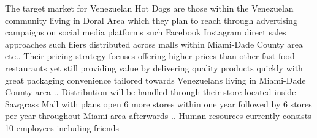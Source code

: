 The target market for Venezuelan Hot Dogs are those within the Venezuelan community living in Doral Area which they plan to reach through advertising campaigns on social media platforms such Facebook Instagram direct sales approaches such fliers distributed across malls within Miami-Dade County area etc.. Their pricing strategy focuses offering higher prices than other fast food restaurants yet still providing value by delivering quality products quickly with great packaging convenience tailored towards Venezuelans living in Miami-Dade County area .. Distribution will be handled through their store located inside Sawgrass Mall with plans open 6 more stores within one year followed by 6 stores per year throughout Miami area afterwards .. Human resources currently consists 10 employees including friends
